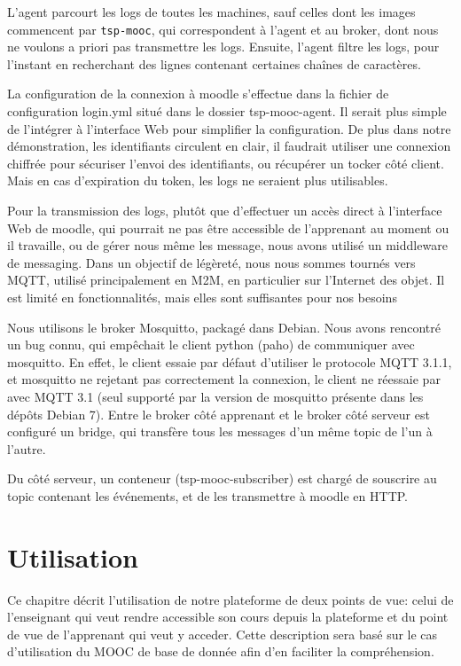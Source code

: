 \documentclass[a4paper,11pt]{report}
\begin{document}
L'agent parcourt les logs de toutes les machines, sauf celles dont les images commencent par \texttt{tsp-mooc}, qui correspondent à l'agent et au broker, dont nous ne voulons a priori pas transmettre les logs. Ensuite, l'agent filtre les logs, pour l'instant en recherchant des lignes contenant certaines chaînes de caractères.

La configuration de la connexion à moodle s'effectue dans la fichier de configuration login.yml situé dans le dossier tsp-mooc-agent. Il serait plus simple de l'intégrer à l'interface Web pour simplifier la configuration. De plus dans notre démonstration, les identifiants circulent en clair, il faudrait utiliser une connexion chiffrée pour sécuriser l'envoi des identifiants, ou récupérer un tocker côté client. Mais en cas d'expiration du token, les logs ne seraient plus utilisables.

Pour la transmission des logs, plutôt que d'effectuer un accès direct à l'interface Web de moodle, qui pourrait ne pas être accessible de l'apprenant au moment ou il travaille, ou de gérer nous même les message, nous avons utilisé un middleware de messaging. Dans un objectif de légèreté, nous nous sommes tournés vers MQTT, utilisé principalement en M2M, en particulier sur l'Internet des objet. Il est limité en fonctionnalités, mais elles sont suffisantes pour nos besoins

Nous utilisons le broker Mosquitto\cite{mosquitto}, packagé dans Debian. Nous avons rencontré un bug connu\cite{bug-mosquitto}, qui empêchait le client python (paho) de communiquer avec mosquitto. En effet, le client essaie par défaut d'utiliser le protocole MQTT 3.1.1, et mosquitto ne rejetant pas correctement la connexion, le client ne réessaie par avec MQTT 3.1 (seul supporté par la version de mosquitto présente dans les dépôts Debian 7). Entre le broker côté apprenant et le broker côté serveur est configuré un bridge, qui transfère tous les messages d'un même topic de l'un à l'autre.

Du côté serveur, un conteneur (tsp-mooc-subscriber) est chargé de souscrire au topic contenant les événements, et de les transmettre à moodle en HTTP.

\chapter{Utilisation}

\thispagestyle{fancy}

Ce chapitre décrit l'utilisation de notre plateforme de deux points de vue: celui de l'enseignant qui veut rendre accessible son cours depuis la plateforme et du point de vue de l'apprenant qui veut y acceder.
Cette description sera basé sur le cas d'utilisation du MOOC de base de donnée afin d'en faciliter la compréhension.
\end{document}
